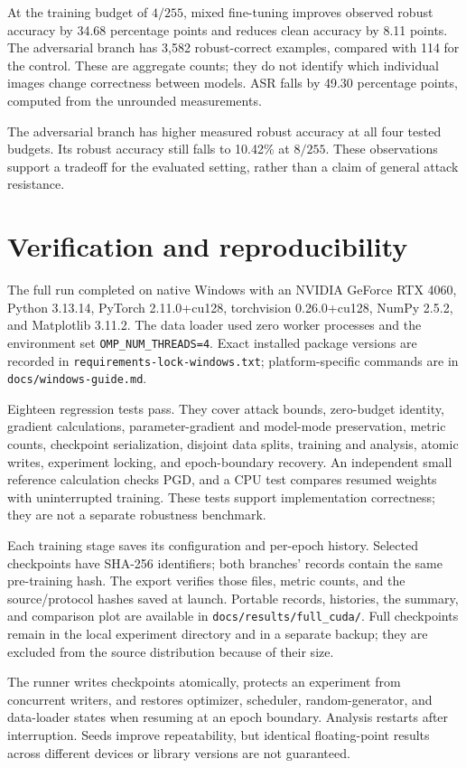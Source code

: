 \documentclass[10pt,a4paper]{article}
\begin{document}
At the training budget of $4/255$, mixed fine-tuning improves observed robust
accuracy by 34.68 percentage points and reduces clean accuracy by 8.11 points.
The adversarial branch has 3,582 robust-correct examples, compared with 114 for
the control. These are aggregate counts; they do not identify which individual
images change correctness between models. ASR falls by 49.30 percentage points,
computed from the unrounded measurements.

The adversarial branch has higher measured robust accuracy at all four tested
budgets. Its robust accuracy still falls to 10.42\% at $8/255$. These observations
support a tradeoff for the evaluated setting, rather than a claim of general
attack resistance.

\newpage
\section{Verification and reproducibility}
The full run completed on native Windows with an NVIDIA GeForce RTX 4060, Python
3.13.14, PyTorch 2.11.0+cu128, torchvision 0.26.0+cu128, NumPy 2.5.2, and
Matplotlib 3.11.2. The data loader used zero worker processes and the environment
set \texttt{OMP\_NUM\_THREADS=4}. Exact installed package versions are recorded in
\texttt{requirements-lock-windows.txt}; platform-specific commands are in
\texttt{docs/windows-guide.md}.

Eighteen regression tests pass. They cover attack bounds, zero-budget identity,
gradient calculations, parameter-gradient and model-mode preservation, metric
counts, checkpoint serialization, disjoint data splits, training and analysis,
atomic writes, experiment locking, and epoch-boundary recovery. An independent
small reference calculation checks PGD, and a CPU test compares resumed weights
with uninterrupted training. These tests support implementation correctness;
they are not a separate robustness benchmark.

Each training stage saves its configuration and per-epoch history. Selected
checkpoints have SHA-256 identifiers; both branches' records contain the same
pre-training hash. The export verifies those files, metric counts, and the
source/protocol hashes saved at launch. Portable records, histories, the summary,
and comparison plot are available in \texttt{docs/results/full\_cuda/}. Full
checkpoints remain in the local experiment directory and in a separate backup;
they are excluded from the source distribution because of their size.

The runner writes checkpoints atomically, protects an experiment from concurrent
writers, and restores optimizer, scheduler, random-generator, and data-loader
states when resuming at an epoch boundary. Analysis restarts after interruption.
Seeds improve repeatability, but identical floating-point results across different
devices or library versions are not guaranteed.
\end{document}
